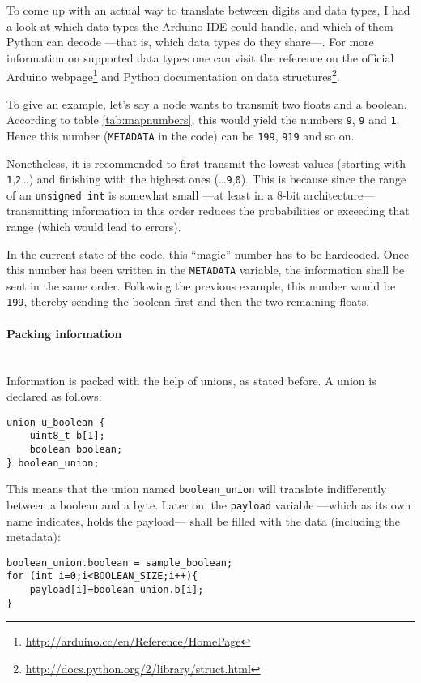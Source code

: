 To come up with an actual way to translate between digits and data types, I had a look at which data types the Arduino IDE could handle, and which of them Python can decode ---that is, which data types do they share---. For more information on supported data types one can visit the reference on the official Arduino webpage\footnote{\url{http://arduino.cc/en/Reference/HomePage}} and Python documentation on data structures\footnote{\url{http://docs.python.org/2/library/struct.html}}.

To give an example, let's say a node wants to transmit two floats and a boolean. According to table \ref{tab:mapnumbers}, this would yield the numbers \texttt{9}, \texttt{9} and \texttt{1}. Hence this number (\texttt{METADATA} in the code) can be \texttt{199}, \texttt{919} and so on. 

Nonetheless, it is recommended to first transmit the lowest values (starting with \texttt{1},\texttt{2}\ldots) and finishing with the highest ones (\ldots\texttt{9},\texttt{0}). This is because since the range of an \texttt{unsigned int} is somewhat small ---at least in a 8-bit architecture--- transmitting information in this order reduces the probabilities or exceeding that range (which would lead to errors).

In the current state of the code, this ``magic'' number has to be hardcoded. Once this number has been written in the \texttt{METADATA} variable, the information shall be sent in the same order. Following the previous example, this number would be \texttt{199}, thereby sending the boolean first and then the two remaining floats.

\paragraph{Packing information}
~\\
Information is packed with the help of unions, as stated before. A union is declared as follows:

\begin{verbatim}
union u_boolean {
    uint8_t b[1];
    boolean boolean;
} boolean_union;
\end{verbatim}

This means that the union named \texttt{boolean\_union} will translate indifferently between a boolean and a byte. Later on, the \texttt{payload} variable ---which as its own name indicates, holds the payload--- shall be filled with the data (including the metadata):

\begin{verbatim}
boolean_union.boolean = sample_boolean;
for (int i=0;i<BOOLEAN_SIZE;i++){
    payload[i]=boolean_union.b[i];
}
\end{verbatim}

